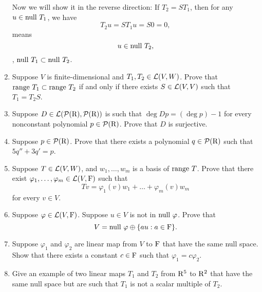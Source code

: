 \begin{enumerate}
\begin{solution}
            Now we will show it in the reverse direction: If $T_2 = ST_1$, then for any $u \in \text{null}~T_1$, we have 
            \[ T_2u = ST_1u = S0 = 0,\]
            means 
            \[ u \in \text{null}~T_2, \]
            \ie, $\text{null}~T_1 \subset \text{null}~T_2$.
        \end{solution}
    \item Suppose $V$ is finite-dimensional and $T_1,T_2 \in \mathcal{L}(V, W)$. Prove that $\text{range}~T_1 \subset \text{range}~T_2$ if and only if 
        there exists $S \in \mathcal{L}(V, V)$ such that $T_1 = T_2S$.
    \item Suppose $D \in \mathcal{L}(\mathcal{P}(\mathrm{R}), \mathcal{P}(\mathrm{R}))$ is such that $\deg{Dp} = (\deg{p}) - 1$ for every nonconstant polynomial $p \in \mathcal{P}(\mathrm{R})$.
        Prove that $D$ is surjective.
    \item Suppose $p \in \mathcal{P}(\mathrm{R})$. Prove that there exists a polynomial $q \in \mathcal{P}(\mathrm{R})$ such that $5q''+3q'=p$.
    \item Suppose $T \in \mathcal{L}(V, W)$, and $w_1, \ldots, w_m$ is a basis of $\text{range}~T$. Prove that there exist $\varphi_1, \ldots, \varphi_m \in \mathcal{L}(V, \mathrm{F})$
        such that 
        \[ Tv = \varphi_1(v)w_1 + \dots + \varphi_m(v)w_m \]
        for every $v \in V$.
    \item Suppose $\varphi \in \mathcal{L}(V, \mathrm{F})$. Suppose $u \in V$ is not in $\text{null}~\varphi$. Prove that 
        \[ V = \text{null}~\varphi \oplus \{au: a\in \mathrm{F} \}. \]
    \item Suppose $\varphi_1$ and $\varphi_2$ are linear map from $V$ to $\mathrm{F}$ that have the same null space. 
        Show that there exists a constant $c \in \mathrm{F}$ such that $\varphi_1 = c\varphi_2$.
    \item Give an example of two linear maps $T_1$ and $T_2$ from $\mathrm{R}^5$ to $\mathrm{R}^2$ that have the same null space but are 
        such that $T_1$ is not a scalar multiple of $T_2$. 
\end{enumerate}